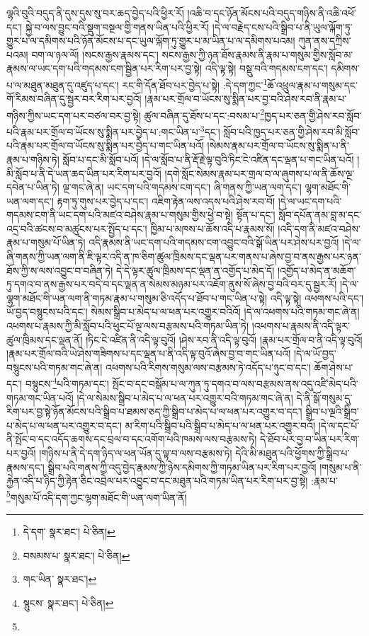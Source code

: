 ལྷའི་བུའི་བདུད་ནི་དུས་དུས་སུ་བར་ཆད་བྱེད་པའི་ཕྱིར་རོ། །འཆི་བ་དང་ཉོན་མོངས་པའི་བདུད་གཉིས་ནི་འཆི་འཕོ་དང་། སྐྱེ་བ་ལས་བྱུང་བའི་སྡུག་བསྔལ་གྱི་གནས་ཡིན་པའི་ཕྱིར་རོ། །དེ་ལ་བརྗེད་ངས་པའི་སྒྲིབ་པ་ནི་ཡུལ་ལྐོག་ཏུ་གྱུར་པ་ལ་དམིགས་པའི་ཉོན་མོངས་པ་དང་ཡུལ་ལྐོག་ཏུ་གྱུར་པ་མ་ཡིན་པ་ལ་དམིགས་པའམ། ཀུན་ནས་དཀྲིས་པའམ། བག་ལ་ཉལ་ལོ། །སངས་རྒྱས་རྣམས་དང་། སངས་རྒྱས་ཀྱི་ཉན་ཐོས་རྣམས་ནི་རྣམ་པ་གསུམ་གྱིས་སློབ་མ་རྣམས་ལ་ཡང་དག་པའི་གདམས་ངག་སྦྱིན་པར་རིག་པར་བྱ་སྟེ། འདི་ལྟ་སྟེ། བསྡུ་བའི་གདམས་ངག་དང་། དམིགས་པ་ལ་མཐུན་མཐུན་དུ་འཛུད་པ་དང་། རང་གི་དོན་ཐོབ་པར་བྱེད་པ་སྟེ། :དེ་དག་ཀྱང་\footnote{དེ་དག་  སྣར་ཐང་།  པེ་ཅིན། }ཆོ་འཕྲུལ་རྣམ་པ་གསུམ་དང་གོ་རིམས་བཞིན་དུ་སྦྱར་བར་རིག་པར་བྱའོ། །རྣམ་པར་གྲོལ་བ་ཡོངས་སུ་སྨིན་པར་བྱ་བའི་ཤེས་རབ་ནི་རྣམ་པ་གཉིས་ཀྱིས་ཡང་དག་པར་བཙལ་བར་བྱ་སྟེ། ཚུལ་བཞིན་དུ་ཐོས་པ་དང་:བསམ་པ་\footnote{བསམས་པ་  སྣར་ཐང་།  པེ་ཅིན། }ཁྱད་པར་ཅན་གྱི་ཤེས་རབ་སློབ་པའི་རྣམ་པར་གྲོལ་བ་ཡོངས་སུ་སྨིན་པར་བྱེད་པ་:གང་ཡིན་པ་\footnote{གང་ཡིན་  སྣར་ཐང་། }དང་། སློབ་པའི་ཁྱད་པར་ཅན་གྱི་ཤེས་རབ་མི་སློབ་པའི་རྣམ་པར་གྲོལ་བ་ཡོངས་སུ་སྨིན་པར་བྱེད་པ་གང་ཡིན་པའོ། །སེམས་རྣམ་པར་གྲོལ་བ་ཡོངས་སུ་སྨིན་པ་ནི་རྣམ་པ་གཉིས་ཏེ། སློབ་པ་དང་མི་སློབ་པའོ། །དེ་ལ་སློབ་པ་ནི་རྡོ་རྗེ་ལྟ་བུའི་ཏིང་ངེ་འཛིན་དང་ལྡན་པ་གང་ཡིན་པའོ། །མི་སློབ་པ་ནི་དེ་ཡན་ཆད་ཡིན་པར་རིག་པར་བྱའོ། །དགེ་སློང་སེམས་རྣམ་པར་གྲལ་བ་ལ་ཞུགས་པ་ལ་ནི་ཆོས་ལྔ་དབེན་པ་ཡིན་ཏེ། ལྔ་གང་ཞེ་ན། ཡང་དག་པའི་གདམས་ངག་དང་། ཞི་གནས་ཀྱི་ཡན་ལག་དང་། ལྷག་མཐོང་གི་ཡན་ལག་དང་། རྟག་ཏུ་གུས་པར་བྱེད་པ་དང་། འཇིག་རྟེན་ལས་འདས་པའི་ཤེས་རབ་བོ། །དེ་ལ་ཡང་དག་པའི་གདམས་ངག་ནི་ཡང་དག་པའི་མཛའ་བཤེས་རྣམ་པ་གསུམ་གྱིས་ཕྱེ་བ་སྟེ། སྟོན་པ་དང་། སློབ་དཔོན་ནམ་བླ་མ་དང་འདྲ་བའི་ཚངས་བ་མཚུངས་པར་སྤྱོད་པ་དང་། ཁྱིམ་པ་མཁས་པ་ཆོས་འདི་པ་རྣམས་སོ། །འདི་དག་ནི་མཛའ་བཤེས་རྣམ་པ་གསུམ་པོ་ཡིན་ཏེ། འདི་རྣམས་ནི་ཡང་དག་པའི་གདམས་ངག་འབྱུང་བའི་སྒོ་ཡིན་པར་ཤེས་པར་བྱའོ། །དེ་ལ་ཞི་གནས་ཀྱི་ཡན་ལག་ནི་ཇི་ལྟར་འདི་ན་ཁ་ཅིག་ཚུལ་ཁྲིམས་དང་ལྡན་པར་གནས་པ་ཞེས་བྱ་བ་ནས་རྒྱས་པར་ཉན་ཐོས་ཀྱི་ས་ལས་འབྱུང་བ་བཞིན་ཏེ། དེ་དེ་ལྟར་ཚུལ་ཁྲིམས་དང་ལྡན་ན་འགྱོད་པ་མེད་དོ། །འགྱོད་པ་མེད་ན་མཆོག་ཏུ་དགའ་བ་ནས་རྒྱས་པར་བདེ་བ་དང་ལྡན་ན་སེམས་མཉམ་པར་འཇོག་ནུས་སོ་ཞེས་བྱ་བའི་བར་དུ་སྦྱར་རོ། །དེ་ལ་ལྷག་མཐོང་གི་ཡན་ལག་ནི་གཏམ་རྣམ་པ་གསུམ་ཅི་འདོད་པ་ཐོབ་པ་གང་ཡིན་པ་སྟེ། འདི་ལྟ་སྟེ། འཕགས་པའི་དང་། ཡོ་བྱད་བསྙུངས་པའི་དང་། སེམས་སྒྲིབ་པ་མེད་པ་ལ་ཕན་པར་འགྱུར་བའིའོ། །དེ་ལ་འཕགས་པའི་གཏམ་གང་ཞེ་ན། འཕགས་པ་རྣམས་ཀྱི་མི་སློབ་པའི་ཕུང་པོ་ལྔ་ལས་བརྩམས་པའི་གཏམ་ཡིན་ཏེ། །འཕགས་པ་རྣམས་ནི་འདི་ལྟར་ཚུལ་ཁྲིམས་དང་ལྡན་ནོ། །ཏིང་ངེ་འཛིན་ནི་འདི་ལྟ་བུའོ། །ཤེས་རབ་ནི་འདི་ལྟ་བུའོ། །རྣམ་པར་གྲོལ་བ་ནི་འདི་ལྟ་བུའོ། །རྣམ་པར་གྲོལ་བའི་ཡེ་ཤེས་གཟིགས་པ་དང་ལྡན་པ་ནི་འདི་ལྟ་བུའོ་ཞེས་བྱ་བ་གང་ཡིན་པའོ། །དེ་ལ་ཡོ་བྱད་བསྙུངས་པའི་གཏམ་གང་ཞེ་ན། འཕགས་པའི་རིགས་གསུམ་ལས་བརྩམས་ཏེ་འདོད་པ་ཉུང་བ་དང་། ཆོག་ཤེས་པ་དང་། བསྙུངས་\footnote{སྙུངས་  སྣར་ཐང་།  པེ་ཅིན། }པའི་གཏམ་དང་། སྤོང་བ་དང་བསྒོམ་པ་ལ་ཀུན་ཏུ་དགའ་བ་ལས་བརྩམས་ནས་འདུ་འཛི་མེད་པའི་གཏམ་གང་ཡིན་པའོ། །དེ་ལ་སེམས་སྒྲིབ་པ་མེད་པ་ལ་ཕན་པར་འགྱུར་བའི་གཏམ་གང་ཞེ་ན། དེ་ནི་སྒོ་གསུམ་དུ་རིག་པར་བྱ་སྟེ་ཉོན་མོངས་པའི་སྒྲིབ་པ་ཐམས་ཅད་ཀྱི་སྒྲིབ་པ་མེད་པ་ལ་ཕན་པར་འགྱུར་བ་དང་། སྒྲིབ་པ་ལྔའི་སྒྲིབ་པ་མེད་པ་ལ་ཕན་པར་འགྱུར་བ་དང་། མ་རིག་པའི་སྒྲིབ་པའི་སྒྲིབ་པ་མེད་པ་ལ་ཕན་པར་འགྱུར་བའོ། །དེ་ལ་དང་པོ་ནི་སྤོང་བ་དང་འདོད་ཆགས་དང་བྲལ་བ་དང་འགོག་པའི་ཁམས་ལས་བརྩམས་ཏེ། དེ་ཐོབ་པར་བྱ་བ་ཡིན་པར་རིག་པར་བྱའོ། །གཉིས་པ་ནི་དེ་དག་ཉིད་ལ་ཕན་ཡོན་དུ་ལྟ་བ་ལས་བརྩམས་ཏེ། དེའི་མི་མཐུན་པའི་ཕྱོགས་ཀྱི་སྒྲིབ་པ་རྣམས་དང་། སྒྲིབ་པའི་གནས་ཀྱི་འདུ་བྱེད་རྣམས་ཀྱི་ཉེས་དམིགས་ཀྱི་གཏམ་ཡིན་པར་རིག་པར་བྱའོ། །གསུམ་པ་ནི་རྐྱེན་འདི་པ་ཉིད་ཀྱི་རྟེན་ཅིང་འབྲེལ་པར་འབྱུང་བ་དང་མཐུན་པའི་གཏམ་ཡིན་པར་རིག་པར་བྱ་སྟེ། :རྣམ་པ་\footnote{}གསུམ་པོ་འདི་དག་ཀྱང་ལྷག་མཐོང་གི་ཡན་ལག་ཡིན་ནོ། 